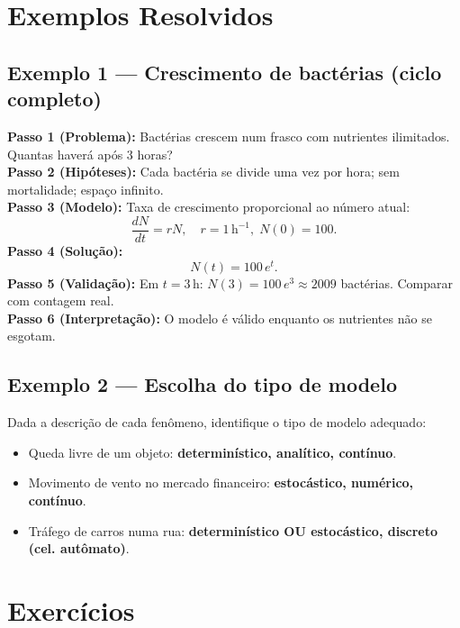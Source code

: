 \documentclass[12pt,a4paper]{article}
\begin{document}
\section*{Exemplos Resolvidos}

\subsection*{Exemplo 1 --- Crescimento de bact\'erias (ciclo completo)}
\textbf{Passo 1 (Problema):} Bact\'erias crescem num frasco com nutrientes ilimitados. Quantas haver\'a ap\'os 3 horas?\\
\textbf{Passo 2 (Hip\'oteses):} Cada bact\'eria se divide uma vez por hora; sem mortalidade; espa\c{c}o infinito.\\
\textbf{Passo 3 (Modelo):} Taxa de crescimento proporcional ao n\'umero atual:
\[
\frac{dN}{dt} = rN, \quad r = 1\,\text{h}^{-1},\; N(0)=100.
\]
\textbf{Passo 4 (Solu\c{c}\~ao):}
\[
N(t) = 100\,e^{t}.
\]
\textbf{Passo 5 (Valida\c{c}\~ao):} Em $t=3\,\text{h}$: $N(3)=100\,e^3 \approx 2009$ bact\'erias. Comparar com contagem real.\\
\textbf{Passo 6 (Interpreta\c{c}\~ao):} O modelo \'e v\'alido enquanto os nutrientes n\~ao se esgotam.

\subsection*{Exemplo 2 --- Escolha do tipo de modelo}
Dada a descri\c{c}\~ao de cada fen\^omeno, identifique o tipo de modelo adequado:
\begin{itemize}
  \item Queda livre de um objeto: \textbf{determin\'istico, anal\'itico, cont\'inuo}.
  \item Movimento de vento no mercado financeiro: \textbf{estoc\'astico, num\'erico, cont\'inuo}.
  \item Tr\'afego de carros numa rua: \textbf{determin\'istico OU estoc\'astico, discreto (cel. autômato)}.
\end{itemize}

\section*{Exerc\'icios}
\end{document}
